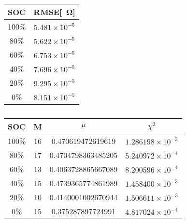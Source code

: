 
\begin{table}[h!]
\centering
\caption{}
\begin{tabular}{|c|c|}
\hline
\textbf{SOC} & \textbf{RMSE}[\SI{}{\ohm}] \\
\hline
100\% & $5.481 \times 10^{-5}$ \\
80\% & $5.622 \times 10^{-5}$ \\
60\% & $6.753 \times 10^{-5}$ \\
40\% & $7.696 \times 10^{-5}$ \\
20\% & $9.295 \times 10^{-5}$ \\
0\% & $8.151 \times 10^{-5}$ \\
\hline
\end{tabular}
\end{table}

\begin{table}[h!]
\centering
\caption{}
\begin{tabular}{|c|c|c|c|}
\hline
SOC & M & $\mu$ & $\chi^2$ \\
\hline
100\% & 16 & 0.470619472619619 & $1.286198 \times 10^{-3}$ \\
80\% & 17 & 0.4704798363485205 & $5.240972 \times 10^{-4}$ \\
60\% & 13 & 0.4063728865667089 & $8.200596 \times 10^{-4}$ \\
40\% & 15 & 0.4739365774861989 & $1.458400 \times 10^{-3}$ \\
20\% & 10 & 0.4140001002670944 & $1.506611 \times 10^{-3}$ \\
0\% & 15 & 0.375287897724991 & $4.817024 \times 10^{-4}$ \\
\hline
\end{tabular}
\end{table}
